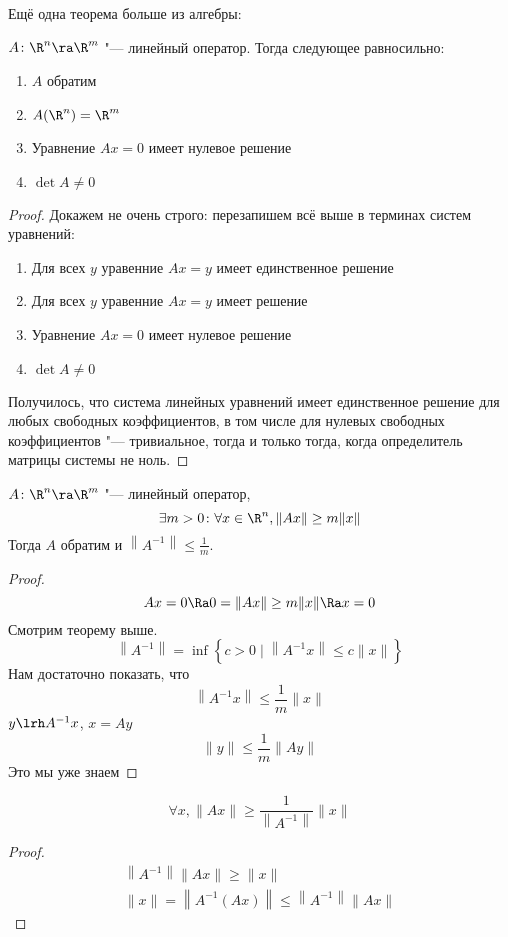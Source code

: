 Ещё одна теорема больше из алгебры:
\begin{theorem}
	$A\colon \R^n \ra \R^m$ "--- линейный оператор. Тогда следующее равносильно:
	\begin{enumerate}
		\item $A$ обратим
		\item $A(\R^n) = \R^m$
		\item Уравнение $Ax = 0$ имеет нулевое решение
		\item $\det A \ne 0$
	\end{enumerate}
\end{theorem}
\begin{proof}
	Докажем не очень строго: перезапишем всё выше в терминах систем уравнений:
	\begin{enumerate}
		\item Для всех $y$ уравенние $Ax = y$ имеет единственное решение
		\item Для всех $y$ уравенние $Ax = y$ имеет решение
		\item Уравнение $Ax = 0$ имеет нулевое решение
		\item $\det A \ne 0$
	\end{enumerate}
	Получилось, что система линейных уравнений имеет единственное решение для любых свободных коэффициентов, в том числе для нулевых свободных коэффициентов "--- тривиальное, тогда и только тогда, когда определитель матрицы системы не ноль.
\end{proof}

\begin{theorem}
	$A\colon \R^n \ra \R^m$ "--- линейный оператор,
	\[ \exists m > 0\colon \forall x \in \R^n, \|Ax\| \ge m\|x\| \]
	Тогда $A$ обратим и $\left\|A^{-1}\right\| \le \frac1m$.
\end{theorem}
\begin{proof}
	\[ Ax = 0 \Ra 0 = \|Ax\| \ge m\|x\| \Ra x = 0 \]
	Смотрим теорему выше.
	\[ \left\|A^{-1}\right\| = \inf \left\{c > 0 \mid \left\|A^{-1} x\right\| \le c \|x\| \right\} \]
	Нам достаточно показать, что
	\[ \left\|A^{-1} x\right\| \le \frac{1}m \|x\| \]
	$y \lrh A^{-1} x$, $x = Ay$
	\[ \|y\| \le \frac{1}m \|Ay\| \]
	Это мы уже знаем
\end{proof}

\begin{Rem}
	\[ \forall x, \|Ax\| \ge \frac{1}{\left\|A^{-1}\right\|} \|x\| \]
\end{Rem}
\begin{proof}
	\begin{gather*}
		\left\| A^{-1} \right\| \|A x\| \ge \|x\| \\
		\|x\| = \left\|A^{-1} (Ax)\right\| \le \left\|A^{-1}\right\| \|A x\|
	\end{gather*}
\end{proof}

